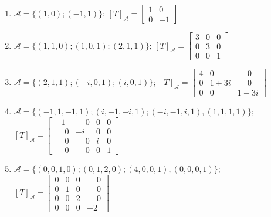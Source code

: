 \documentclass[12pt]{exam}
\begin{document}
\begin{exercicio}
\begin{solucao}
\begin{enumerate}[label=({\alph*})]
          \item $\mathcal{A} = \{(1,0);(-1,1)\}$; $[T]_\mathcal{A} = \begin{bmatrix} 1 & 0\\ 0 & -1\end{bmatrix}$
          \item $\mathcal{A} = \{(1,1,0);(1,0,1);(2,1,1)\}$; $[T]_\mathcal{A} = \begin{bmatrix} 3 & 0 & 0\\ 0 & 3 & 0\\ 0 & 0 & 1\end{bmatrix}$
          \item $\mathcal{A} = \{(2,1,1);(-i,0,1);(i,0,1)\}$; $[T]_\mathcal{A} = \begin{bmatrix} 4 & 0 & \phantom{-} 0\\ 0 & 1 + 3i & \phantom{-} 0\\ 0 & 0 & 1 - 3i\end{bmatrix}$
          \item $\mathcal{A} = \{(-1,1,-1,1); (i,-1,-i,1); (-i,-1,i,1), (1,1,1,1)\}$; $[T]_\mathcal{A} = \begin{bmatrix} -1 & \phantom{-}0 & 0 & 0\\ \phantom{-} 0 & -i & 0 & 0\\ \phantom{-} 0 & \phantom{-}0 & i & 0\\ \phantom{-}0 & \phantom{-}0 & 0 & 1\end{bmatrix}$
          \item $\mathcal{A} = \{(0,0,1,0); (0,1,2,0); (4,0,0,1), (0,0,0,1)\}$; $[T]_\mathcal{A} = \begin{bmatrix} 0 & 0 & 0 & \phantom{-}0\\ 0 & 1 & 0 & \phantom{-}0\\0 & 0 & 2 & \phantom{-}0\\0 & 0 & 0 & -2\end{bmatrix}$
        \end{enumerate}
  \end{solucao}
\end{exercicio}
\end{document}
